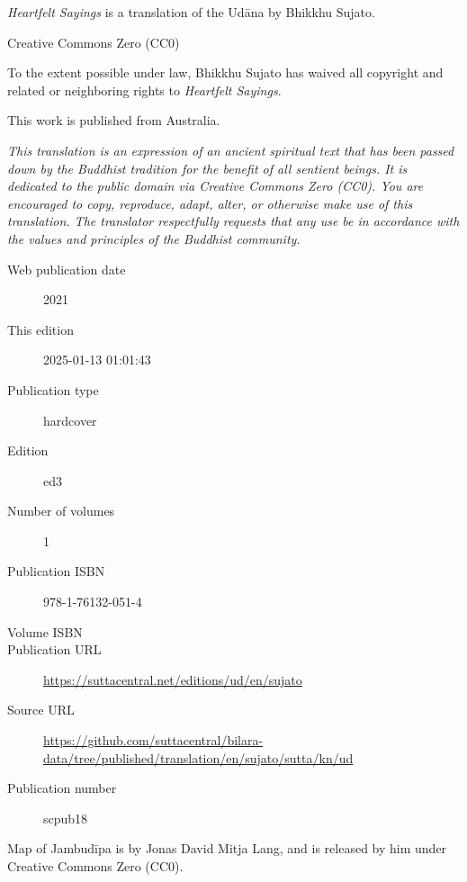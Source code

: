 \documentclass[12pt,openany]{book}%
\begin{document}
\begin{footnotesize}

\textit{Heartfelt Sayings} is a translation of the Udāna by Bhikkhu Sujato.

\medskip

Creative Commons Zero (CC0)

To the extent possible under law, Bhikkhu Sujato has waived all copyright and related or neighboring rights to \textit{Heartfelt Sayings}.

\medskip

This work is published from Australia.

\begin{center}
\textit{This translation is an expression of an ancient spiritual text that has been passed down by the Buddhist tradition for the benefit of all sentient beings. It is dedicated to the public domain via Creative Commons Zero (CC0). You are encouraged to copy, reproduce, adapt, alter, or otherwise make use of this translation. The translator respectfully requests that any use be in accordance with the values and principles of the Buddhist community.}
\end{center}

\medskip

\begin{description}
    \item[Web publication date] 2021
    \item[This edition] 2025-01-13 01:01:43
    \item[Publication type] hardcover
    \item[Edition] ed3
    \item[Number of volumes] 1
    \item[Publication ISBN] 978-1-76132-051-4
    \item[Volume ISBN] 
    \item[Publication URL] \href{https://suttacentral.net/editions/ud/en/sujato}{https://suttacentral.net/editions/ud/en/sujato}
    \item[Source URL] \href{https://github.com/suttacentral/bilara-data/tree/published/translation/en/sujato/sutta/kn/ud}{https://github.com/suttacentral/bilara-data/tree/published/translation/en/sujato/sutta/kn/ud}
    \item[Publication number] scpub18
\end{description}

\medskip

Map of Jambudīpa is by Jonas David Mitja Lang, and is released by him under Creative Commons Zero (CC0).


\end{footnotesize}
\end{document}

